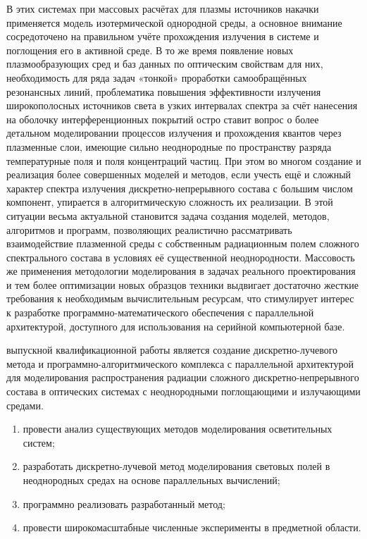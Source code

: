 В этих системах при массовых расчётах для плазмы источников накачки применяется модель изотермической однородной среды, а основное внимание сосредоточено на правильном учёте прохождения излучения в системе и поглощения его в активной среде.
В то же время появление новых плазмообразующих сред и баз данных по оптическим свойствам для них, необходимость для ряда задач «тонкой» проработки самообращённых резонансных линий, проблематика повышения эффективности излучения широкополосных источников света в узких интервалах спектра за счёт нанесения на оболочку интерференционных покрытий остро ставит вопрос о более детальном моделировании процессов излучения и прохождения квантов через плазменные слои, имеющие сильно неоднородные по пространству разряда температурные поля и поля концентраций частиц.
При этом во многом создание и реализация более совершенных моделей и методов, если учесть ещё и сложный характер спектра излучения дискретно-непрерывного состава с большим числом компонент, упирается в алгоритмическую сложность их реализации.
В этой ситуации весьма актуальной становится задача создания моделей, методов, алгоритмов и программ, позволяющих реалистично рассматривать взаимодействие плазменной среды с собственным радиационным полем сложного спектрального состава в условиях её существенной неоднородности.
Массовость же применения методологии моделирования в задачах реального проектирования и тем более  оптимизации новых образцов техники выдвигает достаточно жесткие требования к необходимым вычислительным ресурсам, что стимулирует интерес к разработке программно-математического обеспечения с параллельной архитектурой, доступного для использования на серийной компьютерной базе.

 выпускной квалификационной работы является создание дискретно-лучевого метода и программно-алгоритмического комплекса с параллельной архитектурой для моделирования распространения радиации сложного дискретно-непрерывного состава в оптических системах с неоднородными поглощающими и излучающими средами.


\begin{enumerate}
	\item провести анализ существующих методов моделирования осветительных систем;
	\item разработать дискретно-лучевой метод моделирования световых полей в неоднородных средах на основе параллельных вычислений;
	\item программно реализовать разработанный метод;
	\item провести широкомасштабные численные эксперименты в предметной области.
\end{enumerate}

